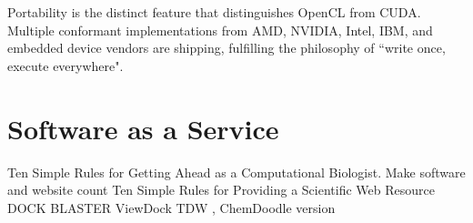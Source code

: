 Portability is the distinct feature that distinguishes OpenCL from CUDA. Multiple conformant implementations from AMD, NVIDIA, Intel, IBM, and embedded device vendors are shipping, fulfilling the philosophy of ``write once, execute everywhere".

\section{Software as a Service}

Ten Simple Rules for Getting Ahead as a Computational Biologist. Make software and website count \citep{260}
Ten Simple Rules for Providing a Scientific Web Resource \citep{677}
DOCK BLASTER \citep{557}
ViewDock TDW \citep{559}, ChemDoodle version

\chapterend
